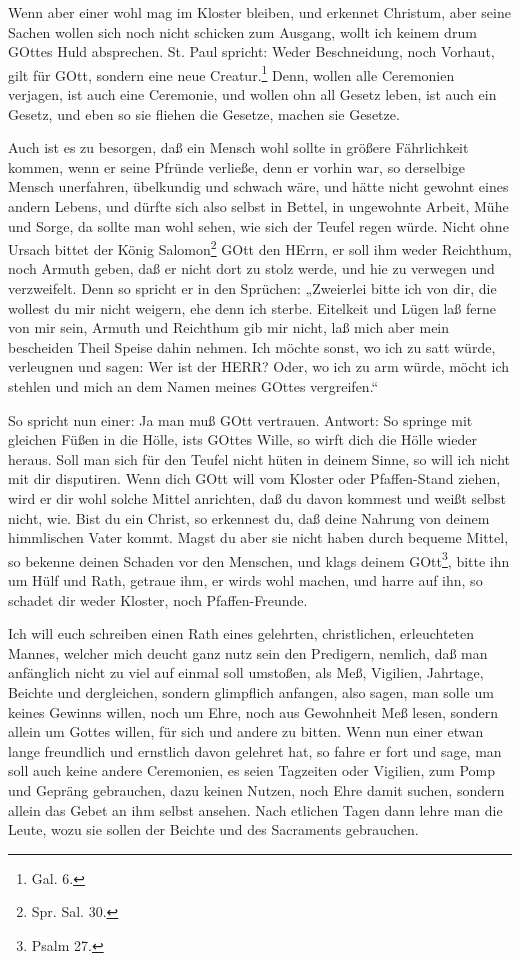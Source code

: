 Wenn aber einer wohl mag im Kloster bleiben, und erkennet Christum, aber seine Sachen wollen sich noch nicht schicken zum Ausgang, wollt ich keinem drum GOttes Huld absprechen. St. Paul spricht: Weder Beschneidung, noch Vorhaut, gilt für GOtt, sondern eine neue Creatur.\footnote{Gal. 6.} Denn, wollen alle Ceremonien verjagen, ist auch eine Ceremonie, und wollen ohn all Gesetz leben, ist auch ein Gesetz, und eben so sie fliehen die Gesetze, machen sie Gesetze.

Auch ist es zu besorgen, daß ein Mensch wohl sollte in größere Fährlichkeit kommen, wenn er seine Pfründe verließe, denn er vorhin war, so derselbige Mensch unerfahren, übelkundig und schwach wäre, und hätte nicht gewohnt eines andern Lebens, und dürfte sich also selbst in Bettel, in ungewohnte Arbeit, Mühe und Sorge, da sollte man wohl sehen, wie sich der Teufel regen würde. Nicht ohne Ursach bittet der König Salomon\footnote{Spr. Sal. 30.} GOtt den HErrn, er soll ihm weder Reichthum, noch Armuth geben, daß er nicht dort zu stolz werde, und hie zu verwegen und verzweifelt. Denn so spricht er in den Sprüchen: „Zweierlei bitte ich von dir, die wollest du mir nicht weigern, ehe denn ich sterbe. Eitelkeit und Lügen laß ferne von mir sein, Armuth und Reichthum gib mir nicht, laß mich aber mein bescheiden Theil Speise dahin nehmen. Ich möchte sonst, wo ich zu satt würde, verleugnen und sagen: Wer ist der HERR? Oder, wo ich zu arm würde, möcht ich stehlen und mich an dem Namen meines GOttes vergreifen.“

So spricht nun einer: Ja man muß GOtt vertrauen. Antwort: So springe mit gleichen Füßen in die Hölle, ists GOttes Wille, so wirft dich die Hölle wieder heraus. Soll man sich für den Teufel nicht hüten in deinem Sinne, so will ich nicht mit dir disputiren. Wenn dich GOtt will vom Kloster oder Pfaffen-Stand ziehen, wird er dir wohl solche Mittel anrichten, daß du davon kommest und weißt selbst nicht, wie. Bist du ein Christ, so erkennest du, daß deine Nahrung von deinem himmlischen Vater kommt. Magst du aber sie nicht haben durch bequeme Mittel, so bekenne deinen Schaden vor den Menschen, und klags deinem GOtt\footnote{Psalm 27.}, bitte ihn um Hülf und Rath, getraue ihm, er wirds wohl machen, und harre auf ihn, so schadet dir weder Kloster, noch Pfaffen-Freunde.

Ich will euch schreiben einen Rath eines gelehrten, christlichen, erleuchteten Mannes, welcher mich deucht ganz nutz sein den
Predigern, nemlich, daß man anfänglich nicht zu viel auf einmal soll umstoßen, als Meß, Vigilien, Jahrtage, Beichte und dergleichen, sondern glimpflich anfangen, also sagen, man solle um keines Gewinns willen, noch um Ehre, noch aus Gewohnheit Meß lesen, sondern allein um Gottes willen, für sich und andere zu bitten. Wenn nun einer etwan lange freundlich und ernstlich davon gelehret hat, so fahre er fort und sage, man soll auch keine andere Ceremonien, es seien Tagzeiten oder Vigilien, zum Pomp und Gepräng gebrauchen, dazu keinen Nutzen, noch Ehre damit suchen, sondern allein das Gebet an ihm selbst ansehen. Nach etlichen Tagen dann lehre man die Leute, wozu sie sollen der Beichte und des Sacraments gebrauchen.

